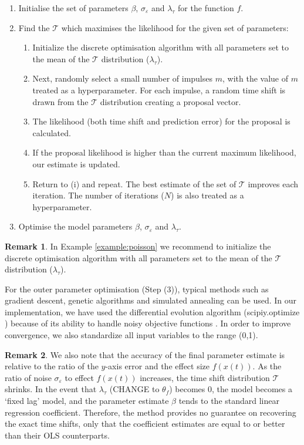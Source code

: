 \documentclass[11pt]{amsart}
\theoremstyle{definition}
\theoremstyle{definition}
\newtheorem*{remark}{Remark}
\begin{document}
\begin{enumerate}
    \item [(1)] Initialise the set of parameters $\beta$, $\sigma_{\varepsilon}$ and $\lambda_{\tau}$ for the function $f$.
    \item [(2)] Find the $\mathcal{T}$ which maximises the likelihood for the given set of parameters:
        \begin{enumerate} 
            \item[(i)] Initialize the discrete optimisation algorithm with all parameters set to the mean of the $\mathcal{T}$ distribution ($\lambda_{\tau}$).
            \item[(ii)] Next, randomly select a small number of impulses $m$, with the value of $m$ treated as a hyperparameter. For each impulse, a random time shift is drawn from the $\mathcal{T}$ distribution creating a proposal vector. 
            \item [(iii)]The likelihood (both time shift and prediction error) for the proposal is calculated. 
            \item[(iv)] If the proposal likelihood is higher than the current maximum likelihood, our estimate is updated.
            \item [(v)] Return to (i) and repeat. The best estimate of the set of $\mathcal{T}$ improves each iteration. The number of iterations ($N$) is also treated as a hyperparameter.
        \end{enumerate} 
    \item [(3)] Optimise the model parameters $\beta$, $\sigma_{\varepsilon}$ and $\lambda_{\tau}$.
\end{enumerate}

\begin{remark}
In Example \ref{example:poisson} we recommend to initialize the discrete optimisation algorithm with all parameters set to the mean of the $\mathcal{T}$ distribution ($\lambda_{\tau}$).
\end{remark}

For the outer parameter optimisation (Step (3)), typical methods such as gradient descent, genetic algorithms and simulated annealing can be used.  In our implementation, we have used the differential evolution algorithm \cite{diff_ev} (scipiy.optimize \cite{scipy}) because of its ability to handle noisy objective functions \cite{diff_ev}. In order to improve convergence, we also standardize all input variables to the range (0,1).


\begin{remark}
We also note that the accuracy of the final parameter estimate is relative to the ratio of the $y$-axis error and the effect size $f(x(t))$. 
As the ratio of noise $\sigma_{\varepsilon}$ to effect $f(x(t))$ increases, the time shift distribution $\mathcal{T}$ shrinks. 
In the event that $\lambda_{\tau}$ (CHANGE to $\theta_{f}$) becomes 0, the model becomes a ‘fixed lag’ model, and the parameter estimate $\beta$ tends to the standard linear regression coefficient. Therefore, the method provides no guarantee on recovering the exact time shifts, only that the coefficient estimates are equal to or better than their OLS counterparts.
\end{remark}
\end{document}
